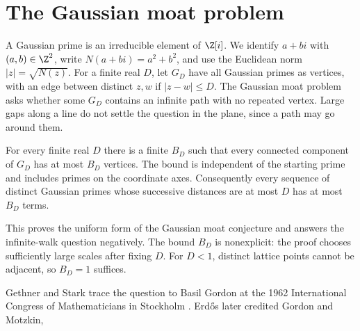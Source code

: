 \begin{abstract}
We prove the Gaussian moat conjecture: no infinite walk through distinct
Gaussian primes can have bounded steps. More strongly, for each fixed finite
step bound, the connected components of the Gaussian-prime graph have
uniformly bounded size. This bound applies to every starting prime, including
primes on the coordinate axes, and is nonexplicit. The proof constructs a
finite periodic sieve obstruction using geometric sampling and
information-theoretic estimates.
\end{abstract}

\section{The Gaussian moat problem}\label{sec:introduction}\label{sec:intro}
A Gaussian prime is an irreducible element of $\Z[i]$.
We identify $a+bi$ with $(a,b)\in\Z^2$, write $N(a+bi)=a^2+b^2$,
and use the Euclidean norm $|z|=\sqrt{N(z)}$.
For a finite real $D$, let $G_D$ have all Gaussian primes as vertices,
with an edge between distinct $z,w$ if $|z-w|\le D$.
The Gaussian moat problem asks whether some $G_D$ contains an infinite
path with no repeated vertex. Large gaps along a line do not settle the
question in the plane, since a path may go around them.

\begin{theorem}\label{thm:main}\label{cor:uniform}
For every finite real $D$ there is a finite $B_D$ such that every
connected component of $G_D$ has at most $B_D$ vertices.
The bound is independent of the starting prime and includes primes on
the coordinate axes. Consequently every sequence of distinct Gaussian
primes whose successive distances are at most $D$ has at most $B_D$ terms.
\end{theorem}

This proves the uniform form of the Gaussian moat conjecture and answers
the infinite-walk question negatively. The bound $B_D$ is nonexplicit:
the proof chooses
sufficiently large scales after fixing $D$. For $D<1$, distinct lattice
points cannot be adjacent, so $B_D=1$ suffices.

Gethner and Stark trace the question to Basil Gordon at the 1962
International Congress of Mathematicians in Stockholm
\cite[p.~289]{GethnerStark}. Erd\H{o}s later credited Gordon and Motzkin,
